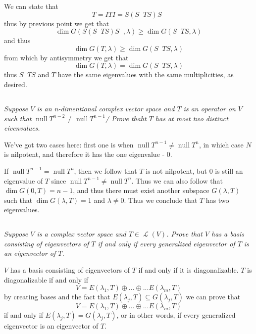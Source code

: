 \documentclass[11pt,oneside,titlepage]{book}
\DeclareMathOperator \map {\mathcal {L}}
\DeclareMathOperator \ns {null}
\DeclareMathOperator \inv {^{-1}}
\begin{document}
We can state that 
$$T = I T I = S (S \inv T S) S \inv$$
thus by previous point we get that 
$$\dim G(S (S \inv T S) S \inv, \lambda) \geq \dim G(S \inv T S, \lambda) $$
and thus
$$\dim G(T, \lambda) \geq \dim G(S \inv T S, \lambda) $$
from which by antisymmetry we get that
$$\dim G(T, \lambda) = \dim G(S \inv T S, \lambda) $$
thus $S \inv T S$ and $T$ have the same eigenvalues with the same multiplicities, as desired.


\subsection{}

\textit{Suppose $V$ is an n-dimentional complex vector space and $T$ is an operator on $V$
  such that $\ns T^{n - 2} \neq \ns T^{n - 1}$/ Prove thaht $T$ has at most two distinct
  eivenvalues.}

We've got two cases here: first one is when $\ns T^{n - 1} \neq \ns T^n$, in which case $N$
is nilpotent, and therefore it has the one eigenvalue - 0.

If $\ns T^{n - 1} = \ns T^n$, then we follow that $T$ is not nilpotent, but $0$ is still an
eigenvalue of $T$ since $\ns T^{n - 1} \neq \ns T^n$. Thus we can also follow that
$\dim G(0, T) = n - 1$, and thus there must exist another subspace $G(\lambda, T)$ such that
$\dim G(\lambda, T) = 1$ and $\lambda \neq 0$. Thus we conclude that $T$ has two
eigenvalues.

\subsection{}

\textit{Suppose $V$ is a complex vector space and $T \in \map(V)$. Prove that $V$
  has a basis consisting of eigenvectors of $T$ if and only if every generalized
  eigenvector of $T$ is an eigenvector of $T$.}


$V$ has a basis consisting of eigenvectors of $T$ if and only if it is diagonalizable.
$T$ is diagonalizable if and only if
$$V = E(\lambda_1, T) \oplus ... \oplus ... E(\lambda_m, T)$$
by creating bases and the fact that $E(\lambda_j, T) \subseteq G(\lambda_j, T)$  we
can prove that
$$V = E(\lambda_1, T) \oplus ... \oplus ... E(\lambda_m, T)$$
if and only if $E(\lambda_j, T) = G(\lambda_j, T)$, or in other words, if every generalized
eigenvector is an eigenvector of $T$.


\subsection{}
\end{document}
